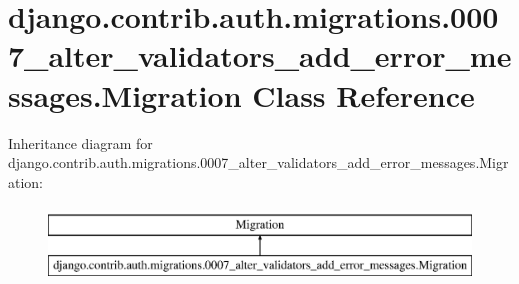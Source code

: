 \hypertarget{classdjango_1_1contrib_1_1auth_1_1migrations_1_10007__alter__validators__add__error__messages_1_1_migration}{}\section{django.\+contrib.\+auth.\+migrations.0007\+\_\+alter\+\_\+validators\+\_\+add\+\_\+error\+\_\+messages.Migration Class Reference}
\label{classdjango_1_1contrib_1_1auth_1_1migrations_1_10007__alter__validators__add__error__messages_1_1_migration}
Inheritance diagram for django.\+contrib.\+auth.\+migrations.0007\+\_\+alter\+\_\+validators\+\_\+add\+\_\+error\+\_\+messages.Migration\+:\begin{figure}[H]
\begin{center}
\leavevmode
\includegraphics[height=2.000000cm]{classdjango_1_1contrib_1_1auth_1_1migrations_1_10007__alter__validators__add__error__messages_1_1_migration}
\end{center}
\end{figure}
